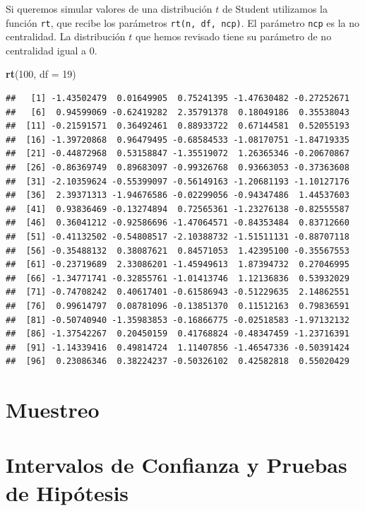 \documentclass[letterpaper,]{book}
\newenvironment{Shaded}{\begin{snugshade}}{\end{snugshade}}
\newcommand{\DataTypeTok}[1]{\textcolor[rgb]{0.13,0.29,0.53}{#1}}
\newcommand{\DecValTok}[1]{\textcolor[rgb]{0.00,0.00,0.81}{#1}}
\newcommand{\KeywordTok}[1]{\textcolor[rgb]{0.13,0.29,0.53}{\textbf{#1}}}
\newcommand{\NormalTok}[1]{#1}
\begin{document}
Si queremos simular valores de una distribución \(t\) de Student utilizamos la función \texttt{rt}, que recibe los parámetros \texttt{rt(n,\ df,\ ncp)}. El parámetro \texttt{ncp} es la no centralidad. La distribución \(t\) que hemos revisado tiene su parámetro de no centralidad igual a \(0\).

\begin{Shaded}
\begin{Highlighting}[]
\KeywordTok{rt}\NormalTok{(}\DecValTok{100}\NormalTok{, }\DataTypeTok{df =} \DecValTok{19}\NormalTok{)}
\end{Highlighting}
\end{Shaded}

\begin{verbatim}
##   [1] -1.43502479  0.01649905  0.75241395 -1.47630482 -0.27252671
##   [6]  0.94599069 -0.62419282  2.35791378  0.18049186  0.35538043
##  [11] -0.21591571  0.36492461  0.88933722  0.67144581  0.52055193
##  [16] -1.39720868  0.96479495 -0.68584533 -1.08170751 -1.84719335
##  [21] -0.44872968  0.53158847 -1.35519072  1.26365346 -0.20670867
##  [26] -0.86369749  0.89683097 -0.99326768  0.93663053 -0.37363608
##  [31] -2.10359624 -0.55399097 -0.56149163 -1.20681193 -1.10127176
##  [36]  2.39371313 -1.94676586 -0.02299056 -0.94347486  1.44537603
##  [41]  0.93836469 -0.13274894  0.72565361 -1.23276138 -0.82555587
##  [46]  0.36041212 -0.92586696 -1.47064571 -0.84353484  0.83712660
##  [51] -0.41132502 -0.54808517 -2.10388732 -1.51511131 -0.88707118
##  [56] -0.35488132  0.38087621  0.84571053  1.42395100 -0.35567553
##  [61] -0.23719689  2.33086201 -1.45949613  1.87394732  0.27046995
##  [66] -1.34771741 -0.32855761 -1.01413746  1.12136836  0.53932029
##  [71] -0.74708242  0.40617401 -0.61586943 -0.51229635  2.14862551
##  [76]  0.99614797  0.08781096 -0.13851370  0.11512163  0.79836591
##  [81] -0.50740940 -1.35983853 -0.16866775 -0.02518583 -1.97132132
##  [86] -1.37542267  0.20450159  0.41768824 -0.48347459 -1.23716391
##  [91] -1.14339416  0.49814724  1.11407856 -1.46547336 -0.50391424
##  [96]  0.23086346  0.38224237 -0.50326102  0.42582818  0.55020429
\end{verbatim}

\hypertarget{sampl}{%
\chapter{Muestreo}\label{sampl}}

\hypertarget{icph}{%
\chapter{Intervalos de Confianza y Pruebas de Hipótesis}\label{icph}}
\end{document}
